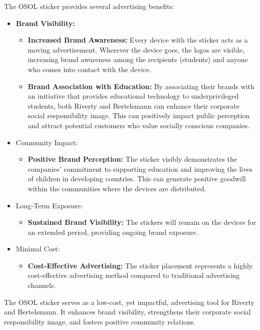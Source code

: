 \documentclass[a4paper,11pt]{article}
\begin{document}
The OSOL sticker provides several advertising benefits:
\begin{itemize}
	\item \textbf{Brand Visibility:}
	\begin{itemize}
		\item \textbf{Increased Brand Awareness:} Every device with the sticker acts as a moving advertisement. Wherever the device goes, the logos are visible, increasing brand awareness among the recipients (students) and anyone who comes into contact with the device.
		\item \textbf{Brand Association with Education:} By associating their brands with an initiative that provides educational technology to underprivileged students, both Riverty and Bertelsmann can enhance their corporate social responsibility image. This can positively impact public perception and attract potential customers who value socially conscious companies.
	\end{itemize}
	\item Community Impact:
	\begin{itemize}
		\item \textbf{Positive Brand Perception:} The sticker visibly demonstrates the companies' commitment to supporting education and improving the lives of children in developing countries. This can generate positive goodwill within the communities where the devices are distributed.
	\end{itemize}
	\item Long-Term Exposure:
	\begin{itemize}
		\item \textbf{Sustained Brand Visibility:} The stickers will remain on the devices for an extended period, providing ongoing brand exposure.
	\end{itemize}
	\item Minimal Cost:
	\begin{itemize}
		\item \textbf{Cost-Effective Advertising:} The sticker placement represents a highly cost-effective advertising method compared to traditional advertising channels.
	\end{itemize}
\end{itemize}

The OSOL sticker serves as a low-cost, yet impactful, advertising tool for Riverty and Bertelsmann. It enhances brand visibility, strengthens their corporate social responsibility image, and fosters positive community relations.
\end{document}

